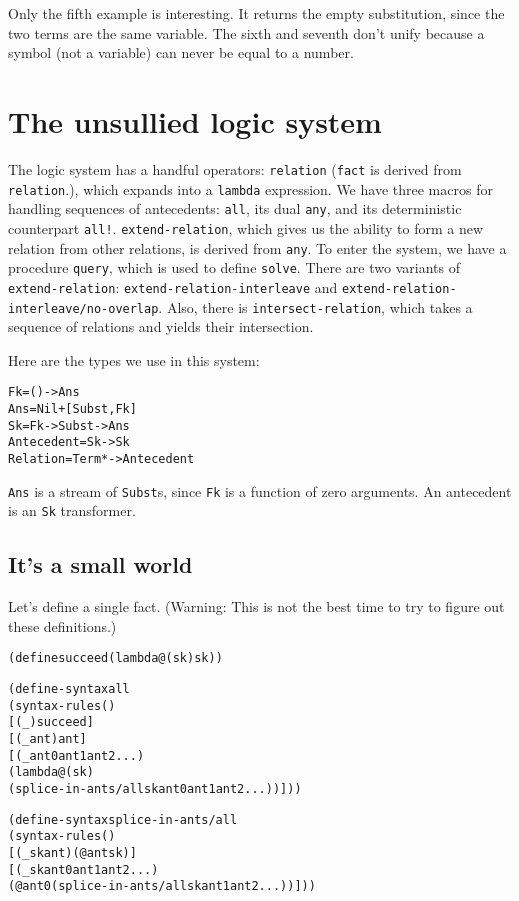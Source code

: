 Only the fifth example is interesting.  It returns the empty
substitution, since the two terms are the same variable.  The sixth
and seventh don't unify because a symbol (not a variable) can never be
equal to a number.

\section{The unsullied logic system}

The logic system has a handful operators: \texttt{relation}
(\texttt{fact} is derived from \texttt{relation}.), which expands into
a \texttt{lambda} expression. We have three macros for handling
sequences of antecedents: \texttt{all}, its dual \texttt{any}, and its
deterministic counterpart \texttt{all!}.  \texttt{extend-relation},
which gives us the ability to form a new relation from other
relations, is derived from \texttt{any}.  To enter the system, we have
a procedure \texttt{query}, which is used to define \texttt{solve}.
There are two variants of \texttt{extend-relation}:
\texttt{extend-relation-interleave} and
\texttt{extend-relation-interleave/no-overlap}.  Also, there is
\texttt{intersect-relation}, which takes a sequence of relations and
yields their intersection.

Here are the types we use in this system:

\begin{alltt}
                  Fk = () -> Ans
                 Ans = Nil + [Subst, Fk]
                  Sk = Fk -> Subst -> Ans
          Antecedent = Sk -> Sk
            Relation = Term* -> Antecedent
\end{alltt}

\texttt{Ans} is a stream of \texttt{Subst}s, since \texttt{Fk} is
a function of zero arguments. An antecedent is an \texttt{Sk}
transformer.

\subsection{It's a small world}

Let's define a single fact. (Warning: This is not the best time to try
to figure out these definitions.)

\begin{alltt}
(define succeed (lambda@ (sk) sk))

(define-syntax all
  (syntax-rules ()
    [(_) succeed]
    [(_ ant) ant]
    [(_ ant0 ant1 ant2 ...)
     (lambda@ (sk)
       (splice-in-ants/all sk ant0 ant1 ant2 ...))]))

(define-syntax splice-in-ants/all
  (syntax-rules ()
    [(_ sk ant) (@ ant sk)]
    [(_ sk ant0 ant1 ant2 ...)
     (@ ant0 (splice-in-ants/all sk ant1 ant2 ...))]))
\end{alltt}

